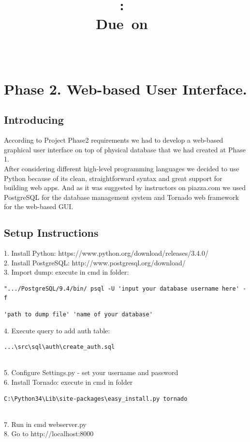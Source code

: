 \documentclass{article}
\title{
\vspace{2in}
\textmd{\textbf{\hmwkClass:\ \hmwkTitle}}\\
\normalsize\vspace{0.1in}\small{Due\ on\ \hmwkDueDate}\\
\vspace{0.1in}\large{\textit{\hmwkClassInstructor\ }}
\vspace{3in}
}
\author{\textbf{\hmwkAuthorName}}
\date{} %
\begin{document}
\maketitle



\newpage
\tableofcontents
\newpage

\section{Phase 2. Web-based User Interface.}

\subsection{Introducing}
According to Project Phase2 requirements we had to develop a web-based graphical user interface on top of physical database that we had created at Phase 1. \\
After considering different high-level programming languages we decided to use Python because of its clean, straightforward syntax and great support for building web apps. And as it was suggested by instructors on piazza.com we used PostgreSQL for the database management system and Tornado web framework for the web-based GUI.

\subsection{Setup Instructions}

1. Install Python: https://www.python.org/download/releases/3.4.0/ \\
2. Install PostgreSQL: http://www.postgresql.org/download/ \\
3. Import dump: execute in cmd in folder: 
\begin{verbatim}
".../PostgreSQL/9.4/bin/ psql -U 'input your database username here' -f \end{verbatim}
\begin{verbatim}
'path to dump file' 'name of your database' 
\end{verbatim} 
4. Execute query to add auth table:
\begin{verbatim}
...\src\sql\auth\create_auth.sql
\end{verbatim} \\
5. Configure Settings.py - set your username and password \\
6. Install Tornado: execute in cmd in folder
\begin{verbatim}
C:\Python34\Lib\site-packages\easy_install.py tornado 
\end{verbatim}\\
7. Run in cmd webserver.py \\
8. Go to http://localhost:8000 \\
\end{document}
